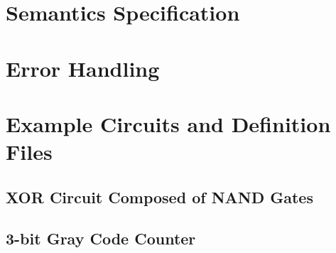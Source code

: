\documentclass[a4paper,11pt]{article}  %
\begin{document}
\section{Semantics Specification}

\section{Error Handling}

\section{Example Circuits and Definition Files}

\subsection{XOR Circuit Composed of NAND Gates}

\subsection{3-bit Gray Code Counter}
\end{document}

